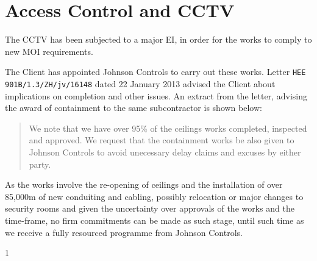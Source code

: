 \chapter{Access Control and CCTV}

The CCTV has been subjected to a major EI, in order for the
works to comply to new MOI requirements.

The Client has appointed Johnson Controls to carry out these works.
Letter \texttt{HEE 901B/1.3/ZH/jv/16148} dated 22 January 2013 advised the Client about implications on completion and other issues. An extract from the letter, advising the award of containment to the same subcontractor is shown below:

\begin{quotation}
We note that we have over 95\% of the ceilings works completed, inspected and approved. We request that the containment works  be also given to Johnson Controls to avoid unecessary delay claims and excuses by either party.
\end{quotation}

As the works involve the re-opening of ceilings and the installation of over 85,000\si{\meter} of new conduiting and cabling, possibly relocation or major changes to security rooms and given the uncertainty over approvals of the works and the time-frame, no firm commitments can be made as such stage, until such time as we receive a fully resourced programme from Johnson Controls.

\textcircled{1}
